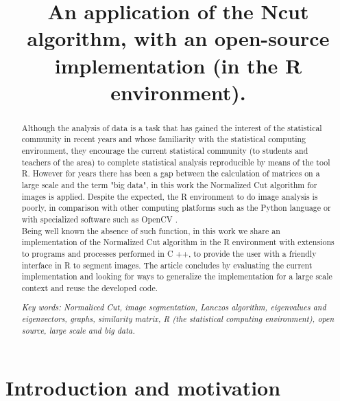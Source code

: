 \documentclass[conference]{IEEEtran}
\begin{document}
\title{An application of the Ncut algorithm, with an open-source implementation (in the R environment).  }


\author{
}



\maketitle

\begin{abstract}
Although the analysis of data is a task that has gained the interest of the statistical community in recent years and whose familiarity with the statistical computing environment, they encourage the current statistical community (to students and teachers of the area) to complete statistical analysis reproducible by means of the tool R.
However for years there has been a gap between the calculation of matrices on a large scale and the term "big data", in this work the Normalized Cut algorithm for images is applied. Despite the expected, the R environment to do image analysis is poorly, in comparison with other computing platforms such as the Python language or with specialized software such as OpenCV \cite {OpenCV}. \\
Being well known the absence of such function, in this work we share an implementation of the Normalized Cut algorithm in the R environment with extensions to programs and processes performed in C ++, to provide the user with a friendly interface in R to segment images. The article concludes by evaluating the current implementation and looking for ways to generalize the implementation for a large scale context and reuse the developed code.

\textit{Key words: Normaliced Cut, image segmentation, Lanczos algorithm, eigenvalues and eigenvectors, graphs, similarity matrix, R (the statistical computing environment), open source, large scale and big data.}\end{abstract}

\IEEEpeerreviewmaketitle


\section{Introduction and motivation}
\end{document}
